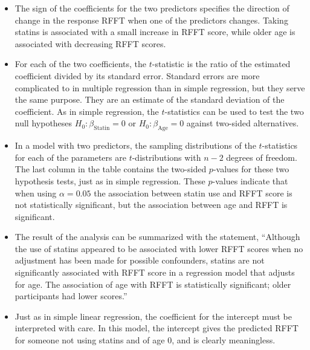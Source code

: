 \begin{itemize}
 \item  The sign of the coefficients for the two predictors specifies the direction of change in the response RFFT when one of the predictors changes. Taking statins is associated with a small increase in RFFT score, while older age is associated with decreasing RFFT scores.
 
 \item  For each of the two coefficients, the $t$-statistic is the ratio of the estimated coefficient divided by its standard error.  Standard errors are more complicated to in multiple regression than in simple regression, but they serve the same purpose.  They are an estimate of the standard deviation of the coefficient.  As in simple regression, the $t$-statistics can be used to test the two null hypotheses $H_0:\beta_{\text{Statin}} = 0$ or $H_0:\beta_{\text{Age}} = 0$ against two-sided alternatives.
  
  \item In a model with two predictors, the sampling distributions of the $t$-statistics for each of the parameters are $t$-distributions with $n - 2$ degrees of freedom. The last column in the table contains the two-sided $p$-values for these two hypothesis tests, just as in simple regression.  These $p$-values indicate that when using $\alpha = 0.05$ the association between statin use and RFFT score is not statistically significant, but the association between age and RFFT is significant.
  
  \item  The result of the analysis can be summarized with the statement, ``Although the use of statins appeared to be associated with lower RFFT scores when no adjustment has been made for possible confounders, statins are not significantly associated with RFFT score in a regression model that adjusts for age.  The association of age with RFFT is statistically significant; older participants had lower scores.''
  
  \item Just as in simple linear regression, the coefficient for the intercept must be interpreted with care.  In this model, the intercept gives the predicted RFFT for someone not using statins and of age 0, and is clearly meaningless.
  

\end{itemize}
